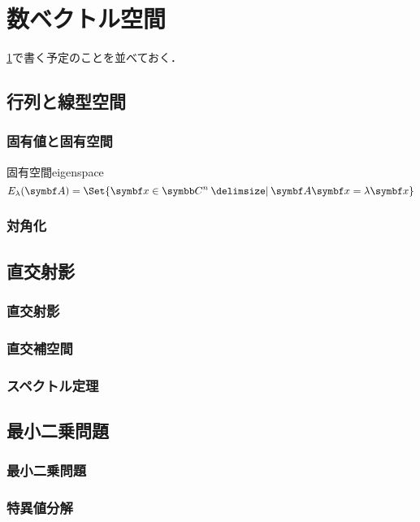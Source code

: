 \documentclass[../../main]{subfiles}
\begin{document}
\chapter{数ベクトル空間}
\label{chapter:numerical_vector_space}

\begin{lead}
  \cref{chapter:numerical_vector_space}で書く予定のことを並べておく．
\end{lead}

\section{行列と線型空間}
\subsection{固有値と固有空間}
\begin{definition}{固有空間}{eigenspace}
\[
  E_\lambda(\mat{A}) = \Set{\vect{x}\in\numset{C}^n\given\mat{A}\vect{x}=\lambda\vect{x}}
\]  
\end{definition}
\subsection{対角化}

\section{直交射影}
\subsection{直交射影}
\subsection{直交補空間}
\subsection{スペクトル定理}

\section{最小二乗問題}
\subsection{最小二乗問題}
\subsection{特異値分解}
\end{document}
